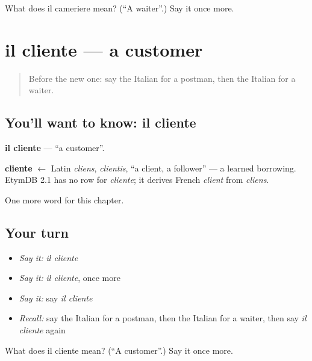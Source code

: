 \begin{tcolorbox}[breakable,colback=teal!4,colframe=teal!35!black,title={Before you move on}]
What does il cameriere mean? (\textquotedblleft{}A waiter\textquotedblright{}.) Say it once more.
\end{tcolorbox}
\section[il cliente]{il cliente — a customer}

\label{lesson:IT-C113-cliente}



\begin{quote}
Before the new one: say the Italian for a postman, then the Italian for a waiter.
\end{quote}

\subsection*{You'll want to know: il cliente}
\textbf{il cliente} — \textquotedblleft{}a customer\textquotedblright{}.

\begin{cousinweb}
\textbf{cliente} $\leftarrow$ Latin \emph{cliens}, \emph{clientis}, \textquotedblleft{}a client, a follower\textquotedblright{} — a learned borrowing. EtymDB 2.1 has no row for \emph{cliente}; it derives French \emph{client} from \emph{cliens}.
\end{cousinweb}

\begin{grammarlens}[title={What you've built}]
One more word for this chapter.
\end{grammarlens}

\subsection*{Your turn}
\begin{itemize}
\raggedright
  \item \emph{Say it:} \emph{il cliente}
  \item \emph{Say it:} \emph{il cliente}, once more
  \item \emph{Say it:} say \emph{il cliente}
  \item \emph{Recall:} say the Italian for a postman, then the Italian for a waiter, then say \emph{il cliente} again
\end{itemize}

\begin{tcolorbox}[breakable,colback=teal!4,colframe=teal!35!black,title={Before you move on}]
What does il cliente mean? (\textquotedblleft{}A customer\textquotedblright{}.) Say it once more.
\end{tcolorbox}
